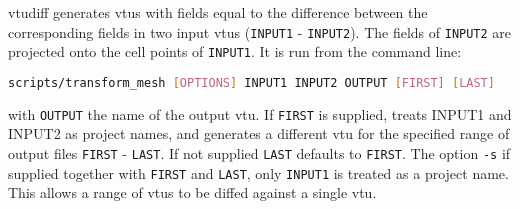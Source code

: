 vtudiff generates vtus with fields equal to the difference between the corresponding fields in two input vtus (\lstinline[language = Bash]+INPUT1+ - \lstinline[language = Bash]+INPUT2+). The fields of \lstinline[language = Bash]+INPUT2+ are projected onto the cell points of \lstinline[language = Bash]+INPUT1+. It is run from the command line:
\begin{lstlisting}[language = Bash]
scripts/transform_mesh [OPTIONS] INPUT1 INPUT2 OUTPUT [FIRST] [LAST]
\end{lstlisting}
with \lstinline[language = Bash]+OUTPUT+ the name of the output vtu. If \lstinline[language = Bash]+FIRST+ is supplied, treats INPUT1 and INPUT2 as project names, and generates a different vtu for the specified range of output files \lstinline[language = Bash]+FIRST+ - \lstinline[language = Bash]+LAST+. If not supplied \lstinline[language = Bash]+LAST+ defaults to \lstinline[language = Bash]+FIRST+. The option \lstinline[language = Bash]+-s+ if supplied together with \lstinline[language = Bash]+FIRST+ and \lstinline[language = Bash]+LAST+, only \lstinline[language = Bash]+INPUT1+ is treated as a project name. This allows a range of vtus to be diffed against a single vtu.



